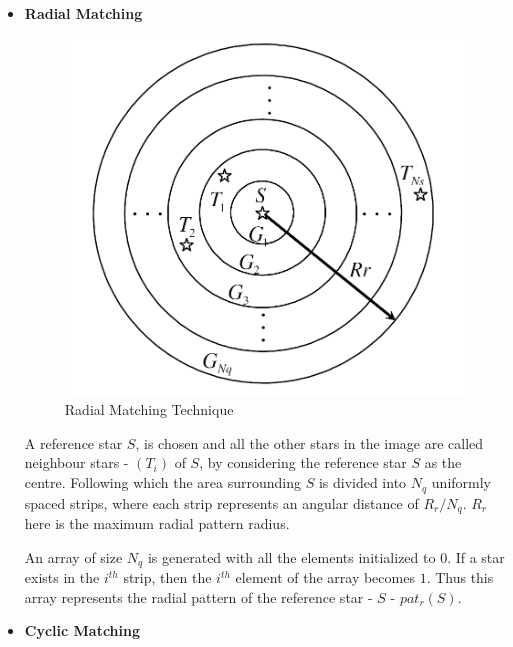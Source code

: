 \documentclass[../../main.tex]{subfiles}
\begin{document}
\begin{itemize}
    \item \textbf{Radial Matching}
    
    \begin{figure}[!h]
        \centering
        \includegraphics[scale=0.35]{Figures/GNC/radial_technique.PNG}
        \caption{Radial Matching Technique}
        \label{fig:radial}
    \end{figure}
    
    A reference star $S$, is chosen and all the other stars in the image are called neighbour stars - $(T_i)$ of $S$, by considering the reference star $S$ as the centre. Following which the area surrounding $S$ is divided into $N_q$ uniformly spaced strips, where each strip represents an angular distance of $R_r/N_q$. $R_r$ here is the maximum radial pattern radius. 
    
    An array of size $N_q$ is generated with all the elements initialized to $0$. If a star exists in the $i^{th}$ strip, then the $i^{th}$ element of the array becomes $1$. Thus this array represents the radial pattern of the reference star - $S$ - $pat_r (S)$.
    
    \item \textbf{Cyclic Matching}
    

\end{itemize}
\end{document}

